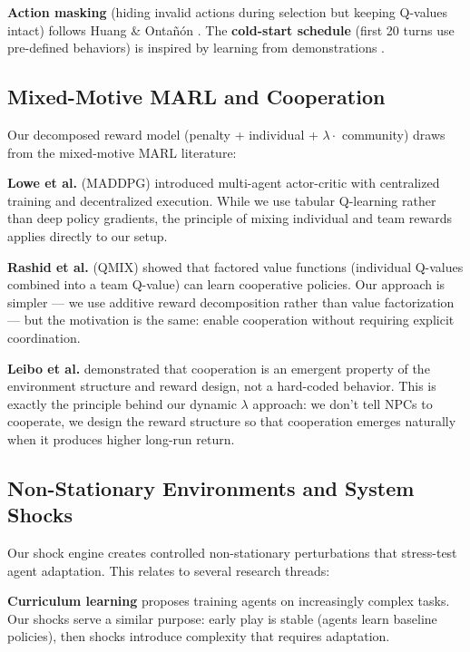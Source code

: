\textbf{Action masking} (hiding invalid actions during selection but keeping Q-values intact) follows Huang \& Onta\~{n}\'{o}n \cite{huang2020action}. The \textbf{cold-start schedule} (first 20 turns use pre-defined behaviors) is inspired by learning from demonstrations \cite{hester2018dqfd, schaal1997demonstration}.

\subsection{Mixed-Motive MARL and Cooperation}

Our decomposed reward model (penalty + individual + $\lambda \cdot$ community) draws from the mixed-motive MARL literature:

\textbf{Lowe et al.} \cite{lowe2017maddpg} (MADDPG) introduced multi-agent actor-critic with centralized training and decentralized execution. While we use tabular Q-learning rather than deep policy gradients, the principle of mixing individual and team rewards applies directly to our setup.

\textbf{Rashid et al.} \cite{rashid2018qmix} (QMIX) showed that factored value functions (individual Q-values combined into a team Q-value) can learn cooperative policies. Our approach is simpler --- we use additive reward decomposition rather than value factorization --- but the motivation is the same: enable cooperation without requiring explicit coordination.

\textbf{Leibo et al.} \cite{leibo2017social} demonstrated that cooperation is an emergent property of the environment structure and reward design, not a hard-coded behavior. This is exactly the principle behind our dynamic $\lambda$ approach: we don't tell NPCs to cooperate, we design the reward structure so that cooperation emerges naturally when it produces higher long-run return.

\subsection{Non-Stationary Environments and System Shocks}

Our shock engine creates controlled non-stationary perturbations that stress-test agent adaptation. This relates to several research threads:

\textbf{Curriculum learning} \cite{bengio2009curriculum} proposes training agents on increasingly complex tasks. Our shocks serve a similar purpose: early play is stable (agents learn baseline policies), then shocks introduce complexity that requires adaptation.

